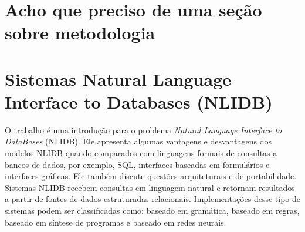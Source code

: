 \documentclass{article}
\begin{document}







\section{Acho que preciso de uma seção sobre metodologia\label{metodologia}}


\section{Sistemas Natural Language Interface to Databases (NLIDB)\label{sistemasNLIDB}}

O trabalho \citep{androutsopoulos1995natural} é uma introdução para o problema \textit{Natural Language Interface to DataBases} (NLIDB). Ele apresenta algumas vantagens e desvantagens dos modelos NLIDB quando comparados com linguagens formais de consultas a bancos de dados, por exemplo, SQL, interfaces baseadas em formulários e interfaces gráficas. Ele também discute questões arquiteturais e de portabilidade. \\

Sistemas NLIDB recebem consultas em linguagem natural e retornam resultados a partir de fontes de dados estruturadas relacionais. Implementações desse tipo de sistemas podem ser classificadas como: baseado em gramática, baseado em regras, baseado em síntese de programas e baseado em redes neurais\citep{speech}.\\
\end{document}
